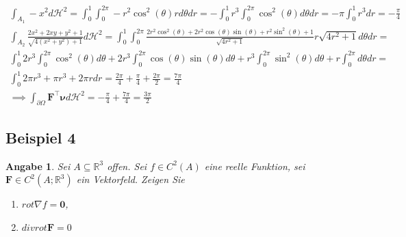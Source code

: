 \documentclass[]{article}
\newtheorem*{angabe*}{Angabe}
\begin{document}
\begin{align*}
	\int_{A_1} -x^2 d\mathcal{H}^2 = \int_{0}^{1} \int_{0}^{2\pi} -r^2 \cos^2(\theta) r d\theta dr = -\int_{0}^{1} r^3 \int_{0}^{2\pi} \cos^2(\theta) d\theta dr = -\pi \int_{0}^{1} r^3 dr = -\frac{\pi}{4}\\
	\int_{A_2} \frac{2x^2 + 2xy + y^2 + 1}{\sqrt{4(x^2+y^2)+1}} d\mathcal{H}^2 = \int_{0}^{1}\int_{0}^{2\pi} \frac{2r^2\cos^2(\theta)+2r^2\cos(\theta)\sin(\theta)+r^2\sin^2(\theta)+1}{\sqrt{4r^2 + 1}} r\sqrt{4r^2+1} d\theta dr =\\
	\int_{0}^{1} 2r^3 \int_{0}^{2\pi} \cos^2(\theta) d\theta + 2r^3 \int_{0}^{2\pi} \cos(\theta)\sin(\theta) d\theta + r^3 \int_{0}^{2\pi} \sin^2(\theta) d\theta + r \int_{0}^{2\pi} d\theta dr =\\
	\int_{0}^{1} 2\pi r^3 + \pi r^3 + 2\pi r dr = \frac{2\pi}{4} + \frac{\pi}{4} + \frac{2\pi}{2} = \frac{7\pi}{4}\\
	\implies \int_{\partial\Omega} \bm{F}^\top \bm{\nu} d\mathcal{H}^2 = -\frac{\pi}{4} + \frac{7\pi}{4} = \frac{3\pi}{2}
\end{align*}
\newpage

\subsection*{Beispiel 4}
\begin{angabe*}
	Sei $A \subseteq \mathbb{R}^3$ offen. Sei $f\in C^2(A)$ eine reelle Funktion, sei $\bm{F} \in C^2(A;\mathbb{R}^3)$ ein Vektorfeld. Zeigen Sie
	\begin{enumerate}[label=(\roman*)]
		\item $rot\nabla f = \bm{0}$,
		\item $div rot \bm{F} = 0$
	\end{enumerate}
\end{angabe*}
\end{document}
